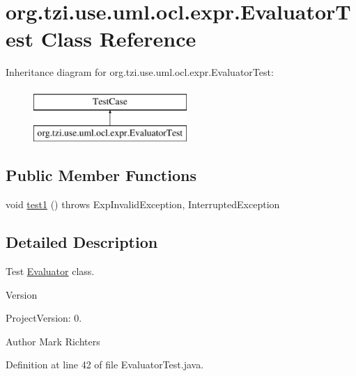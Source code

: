 \hypertarget{classorg_1_1tzi_1_1use_1_1uml_1_1ocl_1_1expr_1_1_evaluator_test}{\section{org.\-tzi.\-use.\-uml.\-ocl.\-expr.\-Evaluator\-Test Class Reference}
\label{classorg_1_1tzi_1_1use_1_1uml_1_1ocl_1_1expr_1_1_evaluator_test}
}
Inheritance diagram for org.\-tzi.\-use.\-uml.\-ocl.\-expr.\-Evaluator\-Test\-:\begin{figure}[H]
\begin{center}
\leavevmode
\includegraphics[height=2.000000cm]{classorg_1_1tzi_1_1use_1_1uml_1_1ocl_1_1expr_1_1_evaluator_test}
\end{center}
\end{figure}
\subsection*{Public Member Functions}
\begin{DoxyCompactItemize}
\item 
void \hyperlink{classorg_1_1tzi_1_1use_1_1uml_1_1ocl_1_1expr_1_1_evaluator_test_a139510e4ead4ff5267b77dfee863cfb2}{test1} ()  throws Exp\-Invalid\-Exception, Interrupted\-Exception 
\end{DoxyCompactItemize}


\subsection{Detailed Description}
Test \hyperlink{classorg_1_1tzi_1_1use_1_1uml_1_1ocl_1_1expr_1_1_evaluator}{Evaluator} class.

\begin{DoxyVersion}{Version}

\end{DoxyVersion}
\begin{DoxyParagraph}{Project\-Version\-:}
0. 
\end{DoxyParagraph}
\begin{DoxyAuthor}{Author}
Mark Richters 
\end{DoxyAuthor}


Definition at line 42 of file Evaluator\-Test.\-java.



